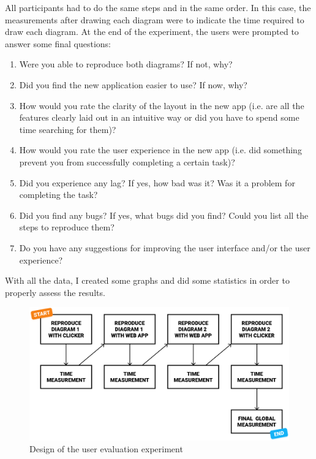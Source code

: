 \documentclass[]{usiinfbachelorproject}
\begin{document}
\noindent All participants had to do the same steps and in the same order. In this case, the measurements after drawing each diagram were to indicate the time required to draw each diagram. At the end of the experiment, the users were prompted to answer some final questions:

\begin{enumerate}
	\item Were you able to reproduce both diagrams? If not, why?
	\item Did you find the new application easier to use? If now, why?
	\item How would you rate the clarity of the layout in the new app (i.e. are all the features clearly laid out in an intuitive way or did you have to spend some time searching for them)?
	\item How would you rate the user experience in the new app (i.e. did something prevent you from successfully completing a certain task)?
	\item Did you experience any lag? If yes, how bad was it? Was it a problem for completing the task?
	\item Did you find any bugs? If yes, what bugs did you find? Could you list all the steps to reproduce them?
	\item Do you have any suggestions for improving the user interface and/or the user experience?
\end{enumerate}

\noindent With all the data, I created some graphs and did some statistics in order to properly assess the results.


\begin{figure}[h!]
\centering
\includegraphics[width=\textwidth-50pt]{figures/experiment-design.png}
\caption {Design of the user evaluation experiment}
\end{figure}
\end{document}
